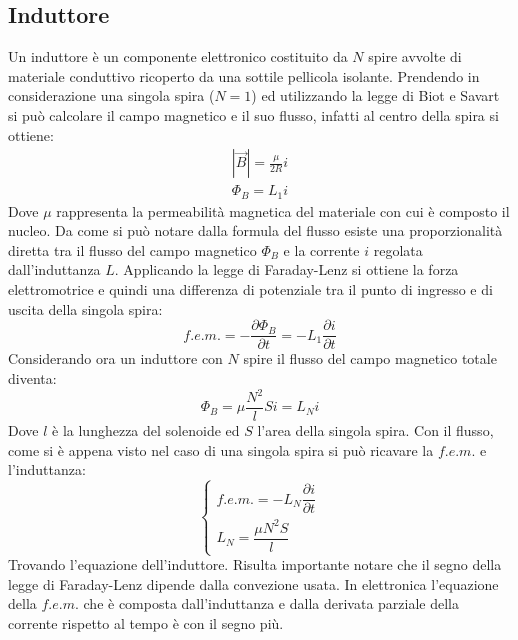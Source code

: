 \documentclass[11pt]{article}
\begin{document}
\subsection{Induttore}
Un induttore è un componente elettronico costituito da $N$ spire avvolte di materiale conduttivo ricoperto da una sottile pellicola isolante. Prendendo in considerazione una singola spira ($N=1$) ed utilizzando la legge di Biot e Savart si può calcolare il campo magnetico e il suo flusso, infatti al centro della spira si ottiene:
\begin{equation}\begin{split}
|\Vec{B}|=\frac{\mu}{2R}i\\
\Phi_B=L_1i
\end{split}\end{equation}
Dove $\mu$ rappresenta la permeabilità magnetica del materiale con cui è composto il nucleo. Da come si può notare dalla formula del flusso esiste una proporzionalità diretta tra il flusso del campo magnetico $\Phi_B$ e la corrente $i$ regolata dall'induttanza $L$. Applicando la legge di Faraday-Lenz si ottiene la forza elettromotrice e quindi una differenza di potenziale tra il punto di ingresso e di uscita della singola spira:
\begin{equation}
    f.e.m.=-\frac{\partial\Phi_B}{\partial t}=-L_1\frac{\partial i}{\partial t}
\end{equation}
Considerando ora un induttore con $N$ spire il flusso del campo magnetico totale diventa:
\begin{equation}
    \Phi_B=\mu\frac{N^2}{l}Si=L_Ni
\end{equation}
Dove $l$ è la lunghezza del solenoide ed $S$ l'area della singola spira. Con il flusso, come si è appena visto nel caso di una singola spira si può ricavare la $f.e.m.$ e l'induttanza:
\begin{equation}
   \begin{cases}
   f.e.m.=-L_N\dfrac{\partial i}{\partial t}\\ L_N=\dfrac{\mu N^2 S}{l}
   \end{cases}
   \label{L}
\end{equation}
Trovando l'equazione dell'induttore. Risulta importante notare che il segno della legge di Faraday-Lenz dipende dalla convezione usata. In elettronica l'equazione della $f.e.m.$ che è composta dall'induttanza e dalla derivata parziale della corrente rispetto al tempo è con il segno più. 
\end{document}
